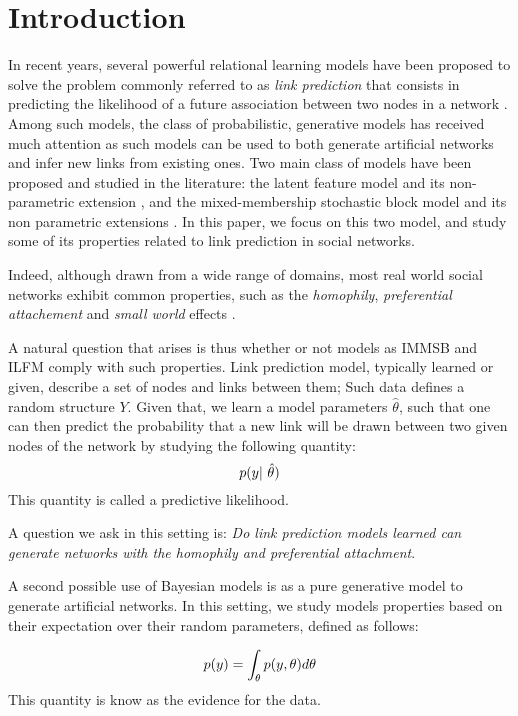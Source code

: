 \section{Introduction}
\label{sec:introduction}
In recent years, several powerful relational learning models have been proposed to solve the problem commonly referred to as \textit{link prediction} that consists in predicting the likelihood of a future association between two nodes in a network \cite{Liben-Nowell07, HassanZaki11}. Among such models, the class of probabilistic, generative models has received much attention as such models can be used to both generate artificial networks and infer new links from existing ones. Two main class of models have been proposed and studied in the literature: the latent feature model \cite{BMF} and its non-parametric extension \cite{ILFRM}, and the mixed-membership stochastic block model \cite{MMSB} and its non parametric extensions \cite{iMMSB,diMMSB}. In this paper, we focus on this two model, and study some of its properties related to link prediction in social networks. 

Indeed, although drawn from a wide range of domains, most real world social networks exhibit common properties, such as the \textit{homophily}, \textit{preferential attachement} and \textit{small world} effects \cite{Newman2010, Barabasi2003}. 


A natural question that arises is thus whether or not models as IMMSB and ILFM comply with such properties. Link prediction model, typically learned or given, describe a set of nodes and links between them; Such data defines a random structure $Y$. Given that, we learn a model parameters $\hat \theta$, such that one can then predict the probability that a new link will be drawn between two given nodes of the network by studying the following quantity:
\begin{equation}
\p(y | \hat \theta)
\end{equation}
This quantity is called a predictive likelihood.


A question we ask in this setting is: \textit{Do link prediction models learned can generate networks with the homophily and preferential attachment}.

A second possible use of Bayesian models is as a pure generative model to generate artificial networks. In this setting, we study models properties based on their expectation over their random parameters, defined as follows:

\begin{equation}
p(y) = \int_{\theta} p(y,\theta) d\theta
\end{equation}
This quantity is know as the evidence for the data.

